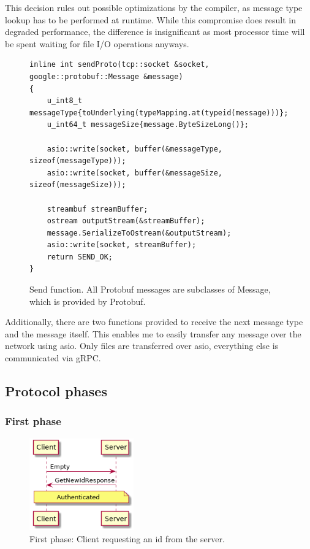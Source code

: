 \documentclass[a4paper]{article}
\begin{document}
This decision rules out possible optimizations by the compiler, as message type lookup has to be performed at runtime. While this compromise does result in degraded performance, the difference is insignificant as most processor time will be spent waiting for file I/O operations anyways.

\begin{figure}[H]
\begin{verbatim}
inline int sendProto(tcp::socket &socket, google::protobuf::Message &message)
{
	u_int8_t messageType{toUnderlying(typeMapping.at(typeid(message)))};
	u_int64_t messageSize{message.ByteSizeLong()};
	
	asio::write(socket, buffer(&messageType, sizeof(messageType)));
	asio::write(socket, buffer(&messageSize, sizeof(messageSize)));
	
	streambuf streamBuffer;
	ostream outputStream(&streamBuffer);
	message.SerializeToOstream(&outputStream);
	asio::write(socket, streamBuffer);
	return SEND_OK;
}
\end{verbatim}
\caption{Send function. All Protobuf messages are subclasses of Message, which is provided by Protobuf.}
\end{figure}

Additionally, there are two functions provided to receive the next message type and the message itself. This enables me to easily transfer any message over the network using asio. Only files are transferred over asio, everything else is communicated via gRPC.

\subsection{Protocol phases}
\label{sec:phases}
\subsubsection{First phase}
\begin{figure}[H]
\centering
\includegraphics[width=4.5cm]{first_stage}
\caption{First phase: Client requesting an id from the server.}
\end{figure}
\end{document}
